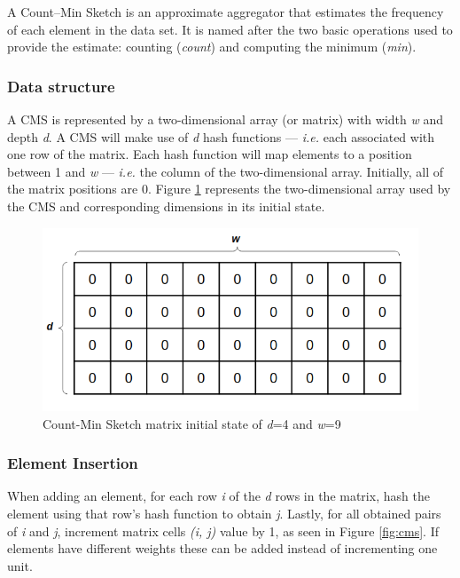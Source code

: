 A Count–Min Sketch \cite{Cormode-CMS} is an approximate aggregator that estimates the frequency of each element in the data set. It is named after the two basic operations used to provide the estimate: counting (\textit{count}) and computing the minimum (\textit{min}).

\subsubsection*{Data structure}
A CMS is represented by a two-dimensional array (or matrix) with width \textit{w} and depth \textit{d}. A CMS will make use of \textit{d} hash functions --- \textit{i.e.} each associated with one row of the matrix. Each hash function will map elements to a position between 1 and \textit{w} --- \textit{i.e.} the column of the two-dimensional array. Initially, all of the matrix positions are 0. Figure \ref{fig:initial-cms} represents the two-dimensional array used by the CMS and corresponding dimensions in its initial state. 

\begin{figure}[!htb]
    \begin{center}
      \includegraphics[scale=0.5]{figures/initial-cms.png}
      \caption[Count-Min Sketch initial state]{Count-Min Sketch matrix initial state of \textit{d}=4 and \textit{w}=9}
      \label{fig:initial-cms}
    \end{center}
\end{figure}

\subsubsection*{Element Insertion}
When adding an element, for each row \textit{i} of the \textit{d} rows in the matrix, hash the element using that row's hash function to obtain \textit{j}. Lastly, for all obtained pairs of \textit{i} and \textit{j}, increment matrix cells \textit{(i, j)} value by 1, as seen in Figure \ref{fig:cms}. If elements have different weights these can be added instead of incrementing one unit.

